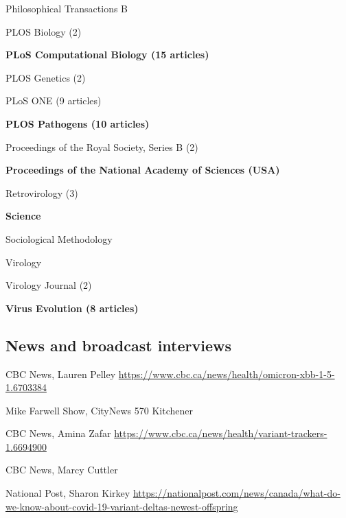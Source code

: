 {\begin{cvitemize}
\item Philosophical Transactions B
\item PLOS Biology         (2)                         
\item \textbf{PLoS Computational Biology     (15 articles)}
\item PLOS Genetics (2)
\item PLoS ONE   (9 articles)
\item \textbf{PLOS Pathogens   (10 articles)}
\item Proceedings of the Royal Society, Series B    (2)
\item \textbf{Proceedings of the National Academy of Sciences (USA)}
\item Retrovirology                                 (3)
\item \textbf{Science} 
\item Sociological Methodology                      
\item Virology                                      
\item Virology Journal                              (2)
\item \textbf{Virus Evolution           (8 articles)}
\end{cvitemize}
}


\subsection {News and broadcast interviews}

{CBC News, Lauren Pelley}
{\url{https://www.cbc.ca/news/health/omicron-xbb-1-5-1.6703384}}
{}{}

{Mike Farwell Show, CityNews 570 Kitchener}
{}
{}{}


{CBC News, Amina Zafar}
{\url{https://www.cbc.ca/news/health/variant-trackers-1.6694900}}
{}{}

{CBC News, Marcy Cuttler}
{}{}{}


{National Post, Sharon Kirkey}
{\url{https://nationalpost.com/news/canada/what-do-we-know-about-covid-19-variant-deltas-newest-offspring}}
{}{}

